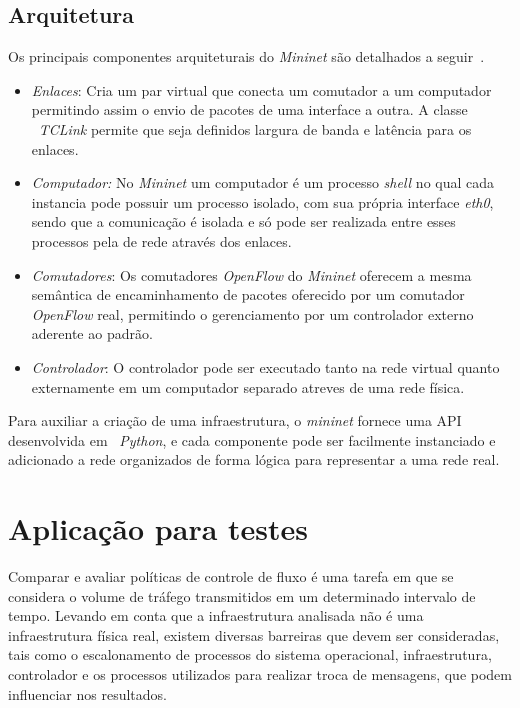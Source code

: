 \subsection{Arquitetura}
\label{sub:arquiteturaMin}


Os principais componentes arquiteturais do \textit{Mininet} são detalhados a seguir~\cite{lantz2010network}.

\begin{itemize}
\item \textit{Enlaces}: Cria um par virtual que conecta um comutador a um computador permitindo assim o envio de pacotes de uma interface a outra. A classe ~\textit{TCLink} permite que seja definidos largura de banda e latência para os enlaces.

\item \textit{Computador:} No \textit{Mininet} um computador é um processo \textit{shell} no qual cada instancia pode possuir um processo isolado, com sua própria interface \textit{eth0}, sendo que a comunicação é isolada e só pode ser realizada entre esses processos pela de rede através dos enlaces.

\item \textit{Comutadores}: Os comutadores \textit{OpenFlow} do \textit{Mininet} oferecem a mesma semântica de encaminhamento de pacotes oferecido por um comutador \textit{OpenFlow} real, permitindo o gerenciamento por um controlador externo aderente ao padrão.
\item \textit{Controlador}:  O controlador pode ser executado tanto na rede virtual quanto externamente em um computador separado atreves de uma rede física.
\end{itemize}

Para auxiliar a criação de uma infraestrutura, o \textit{mininet} fornece uma API desenvolvida em ~\textit{Python}, e cada componente pode ser facilmente instanciado e adicionado a rede organizados de forma lógica para representar a uma rede real. 

\section{Aplicação para testes}
\label{sec:aplicacao_teste_nas}
Comparar e avaliar políticas de controle de fluxo é uma tarefa em que se considera o volume de tráfego transmitidos em um determinado intervalo de tempo. Levando em conta que a infraestrutura analisada não é uma infraestrutura física real, existem diversas barreiras que devem ser consideradas, tais como o escalonamento de processos do sistema operacional, infraestrutura, controlador e os processos utilizados para realizar troca de mensagens, que podem influenciar nos resultados.

